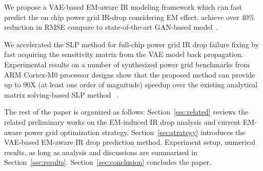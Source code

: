 \begin{itemlist}
\item We propose a VAE-based EM-aware IR modeling framework which can fast predict the on chip power grid IR-drop considering EM effect, achieve over 40$\%$ reduction in RMSE compare to state-of-the-art GAN-based model~\cite{ZhouJin:ICCAD'20}.

\item We accelerated the SLP method for full-chip power grid IR drop failure fixing by fast acquiring the sensitivity matrix from the VAE model back propagation. 
Experimental results on a number of synthesized power grid benchmarks from ARM Cortex-M0 processor designs show that the proposed method can provide up to 90X (at least one order of magnitude) speedup over the existing analytical matrix solving-based SLP method ~\cite{Sukharev:2019pg}.
 
\end{itemlist}

The rest of the paper is organized as follows:
Section~\ref{sec:related} reviews the related preliminary works on the
EM-induced IR drop analysis and current EM-aware power grid
optimization strategy. Section~\ref{sec:strategy} introduces the
VAE-based EM-aware IR drop prediction method. Experiment setup, numerical results, as long as
analysis and discussions are summarized in Section~\ref{sec:results}.
Section~\ref{sec:conclusion} concludes the paper.
